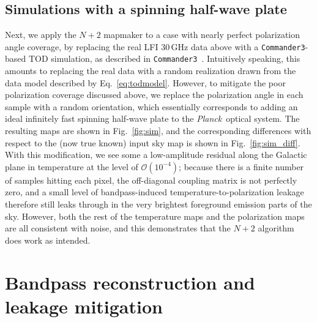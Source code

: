 \documentclass{aa}
\def\commanderthree{\texttt{Commander3}}
\def\Planck{\textit{Planck}}
\begin{document}
\subsection{Simulations with a spinning half-wave plate}
\label{sec:sim}

Next, we apply the $N+2$ mapmaker to a case with nearly perfect polarization angle coverage, by replacing the real LFI 30\,GHz data above with a \commanderthree-based TOD simulation, as described in \commanderthree\ \citep{BP04}. Intuitively speaking, this amounts to replacing the real data with a random realization drawn from the data model described by Eq.~\ref{eq:todmodel}. However, to mitigate the poor polarization coverage discussed above, we replace the polarization angle in each sample with a random orientation, which essentially corresponds to adding an ideal infinitely fast spinning half-wave plate to the \Planck\ optical system. The resulting maps are shown in Fig.~\ref{fig:sim}, and the corresponding differences with respect to the (now true known) input sky map is shown in Fig.~\ref{fig:sim_diff}. With this modification, we see some a low-amplitude residual along the Galactic plane in temperature at the level of $\mathcal{O}(10^{-4})$; because there is a finite number of samples hitting each pixel, the off-diagonal coupling matrix is not perfectly zero, and a small level of bandpass-induced temperature-to-polarization leakage therefore still leaks through in the very brightest foreground emission parts of the sky. However, both the rest of the temperature maps and the polarization maps are all consistent with noise, and this demonstrates that the $N+2$ algorithm does work as intended.

\section{Bandpass reconstruction and leakage mitigation}
\end{document}
